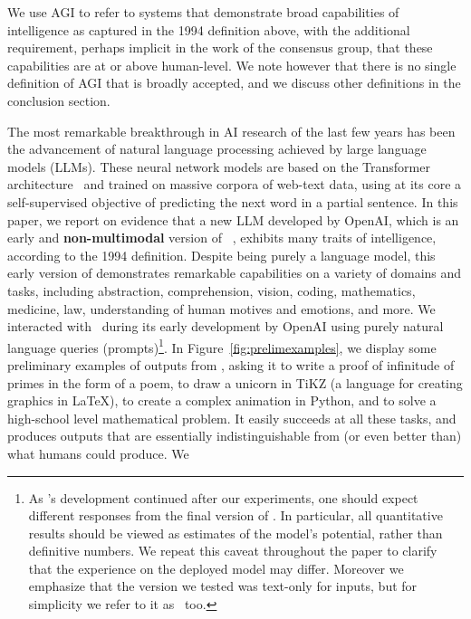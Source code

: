 We use AGI to refer to systems that demonstrate broad capabilities of intelligence as captured in the 1994 definition above, with the additional requirement, perhaps implicit in the work of the consensus group, that these capabilities are at or above human-level. We note however that there is no single definition of AGI that is broadly accepted, and we discuss other definitions in the conclusion section.
\newline 

The most remarkable breakthrough in AI research of the last few years has been the advancement of natural language processing achieved by large language models (LLMs). These neural network models are based on the Transformer architecture~\cite{Vas17} and trained on massive corpora of web-text data, using at its core a self-supervised objective of predicting the next word in a partial sentence.
In this paper, we report on evidence that a new LLM developed by OpenAI, which is an early and \textbf{non-multimodal} version of \DV\ \cite{gpt4}, exhibits many traits of intelligence, according to the 1994 definition. 
Despite being purely a language model, this early version of {\DV} demonstrates remarkable capabilities on a variety of domains and tasks, including abstraction, comprehension, vision, coding, mathematics, medicine, law, understanding of human motives and emotions, and more. 
We interacted with \DV\ during its early development by OpenAI using purely natural language queries (prompts)\footnote{As \DV’s development continued after our experiments, one should expect different responses from the final version of \DV. In particular, all quantitative results should be viewed as estimates of the model’s potential, rather than definitive numbers. We repeat this caveat throughout the paper to clarify that the experience on the deployed model may differ. Moreover we emphasize that the version we tested was text-only for inputs, but for simplicity we refer to it as \DV\ too.}.
In Figure~\ref{fig:prelimexamples}, we display some preliminary examples of outputs from {\DV}, asking it to write a proof of infinitude of primes in the form of a poem, to draw a unicorn in TiKZ (a language for creating graphics in \LaTeX), to create a complex animation in Python, and to solve a high-school level mathematical problem. It easily succeeds at all these tasks, and produces outputs that are essentially indistinguishable from (or even better than) what humans could produce. We 
